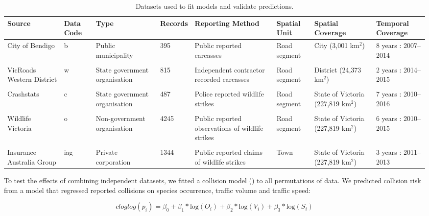 \begin{table}[htp]
\caption[Datasets used to fit collision models and validate predictions]{Datasets used to fit models and validate predictions.}
\centering
\begin{tabularx}{0.9\textwidth}{YYYYYYYY} \toprule
Source						&Data Code	&Type	&Records	&Reporting Method	&Spatial Unit	&Spatial Coverage	&Temporal Coverage \\ \midrule

City of Bendigo		&b		&Public municipality			&395		&Public reported carcasses			&Road segment		&City (3,001 km$^2$)	&8 years : 2007--2014 \\

&&&&&&\\

VicRoads Western District	&w		&State government organisation	&815		&Independent contractor recorded  carcasses			&Road segment		&District (24,373 km$^2$)	&2 years : 2014--2015 \\

&&&&&&\\

Crashstats		&c			&State government organisation	&487		&Police reported wildlife strikes			&Road segment		&State of Victoria (227,819 km$^2$)	&7 years : 2010--2016 \\

&&&&&&\\

Wildlife Victoria	&o		&Non-government organisation	&4245		&Public reported observations of wildlife strikes			&Road segment		&State of Victoria (227,819 km$^2$)	&6 years : 2010--2015 \\

&&&&&&\\

Insurance Australia Group	&iag	&Private corporation			&1344		&Public reported claims of wildlife strikes			&Town		&State of Victoria (227,819 km$^2$)	&3 years : 2011--2013 \\

\bottomrule
\end{tabularx}
\label{val_data}
\end{table}

To test the effects of combining independent datasets, we fitted a collision model () to all permutations of data.  We predicted collision risk from a model that regressed reported collisions on species occurrence, traffic volume and traffic speed:

\begin{equation} \label{eq:61}
cloglog(p_i) = \beta_0 + \beta_1*\text{log}(O_i) + \beta_2*\text{log}(V_i) + \beta_3*\text{log}(S_i)
\end{equation}

